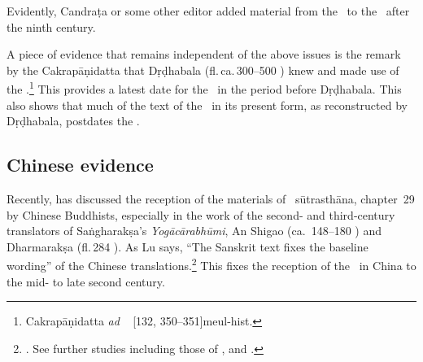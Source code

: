 Evidently, Candraṭa or some other editor added material from the \CS\
to the \SS\ after the ninth century. 

A piece of evidence that remains
independent of the above issues is the remark by the Cakrapāṇidatta 
that Dṛḍhabala (fl.\,ca.\,300--500 \CE) knew and made use of the
\SS.\footnote{Cakrapāṇidatta \emph{ad} \CS\ \Ca{8.12.39}{735}
    [132, 350--351]{meul-hist}.}  This provides a
    latest date for the \SS\ in the period before Dṛḍhabala.  This also
    shows that much of the text of the \CS\ in its present form, as
    reconstructed by Dṛḍhabala, postdates the \SS.
   
\subsection{Chinese evidence}
   
Recently, \citet{lu-2025} has discussed the reception of the materials
of \SS\ sūtrasthāna, chapter~29 by Chinese Buddhists, especially in
the work of the second- and third-century translators of Saṅgharakṣa's
\emph{Yogācārabhūmi}, An Shigao (ca.\ 148--180 \CE) and Dharmarakṣa
(fl.\,284 \CE).  As Lu says, “The Sanskrit text fixes the baseline
wording” of the Chinese translations.\footnote{\cite[2]{lu-2025}.  See
    further studies including those of  \citet{demi-1954},
    \citet{zacc-2010} and \citet{dele-1997}.}  This fixes the reception of
    the \SS\ in China to the mid- to late second century. 
    

